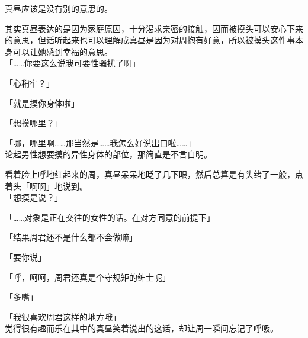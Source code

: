 真昼应该是没有别的意思的。

其实真昼表达的是因为家庭原因，十分渴求亲密的接触，因而被摸头可以安心下来的意思，但话听起来也可以理解成真昼是因为对周抱有好意，所以被摸头这件事本身可以让她感到幸福的意思。\\

「……你要这么说我可要性骚扰了啊」

「心稍牢？」

「就是摸你身体啦」

「想摸哪里？」

「哪，哪里啊……那当然是……我怎么好说出口啦……」\\

论起男性想要摸的异性身体的部位，那简直是不言自明。

看着脸上呼地红起来的周，真昼呆呆地眨了几下眼，然后总算是有头绪了一般，点着头「啊啊」地说到。\\

「想摸是说？」

「……对象是正在交往的女性的话。在对方同意的前提下」

「结果周君还不是什么都不会做嘛」

「要你说」

「呼，呵呵，周君还真是个守规矩的绅士呢」

「多嘴」

「我很喜欢周君这样的地方哦」\\

觉得很有趣而乐在其中的真昼笑着说出的这话，却让周一瞬间忘记了呼吸。\\

